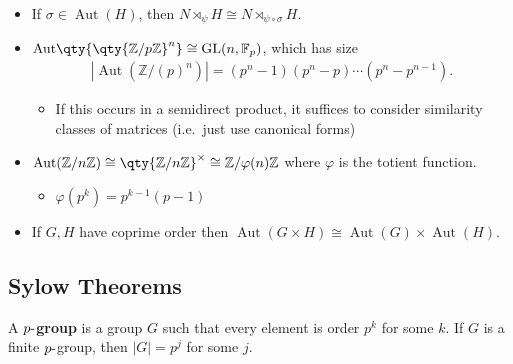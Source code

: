 \begin{fact}

\envlist

\begin{itemize}
\item
  If \(\sigma \in {\operatorname{Aut}}(H)\), then
  \(N \rtimes_\psi H \cong N \rtimes_{\psi \circ \sigma} H\).
\item
  \({\operatorname{Aut}}\qty{ \qty{{\mathbb{Z}}/p{\mathbb{Z}}}^n } \cong \operatorname{GL}(n, {\mathbb{F}}_p)\),
  which has size
  \begin{align*}  
  {\left\lvert {{\operatorname{Aut}}({\mathbb{Z}}/(p)^n)} \right\rvert} = (p^n-1)(p^n-p)\cdots(p^n-p^{n-1})
  .\end{align*}

  \begin{itemize}
  \tightlist
  \item
    If this occurs in a semidirect product, it suffices to consider
    similarity classes of matrices (i.e.~just use canonical forms)
  \end{itemize}
\item
  \({\operatorname{Aut}}({\mathbb{Z}}/n{\mathbb{Z}}) \cong \qty{{\mathbb{Z}}/n{\mathbb{Z}}}^{\times}\cong {\mathbb{Z}}/\varphi(n){\mathbb{Z}}\)
  where \(\varphi\) is the totient function.

  \begin{itemize}
  \tightlist
  \item
    \(\varphi(p^k) = p^{k-1}(p-1)\)
  \end{itemize}
\item
  If \(G, H\) have coprime order then
  \({\operatorname{Aut}}(G \times H) \cong {\operatorname{Aut}}(G) \times{\operatorname{Aut}}(H)\).
\end{itemize}

\end{fact}

\hypertarget{sylow-theorems}{%
\subsection{Sylow Theorems}\label{sylow-theorems}}

\begin{definition}

A \textbf{\(p{\hbox{-}}\)group} is a group \(G\) such that every element
is order \(p^k\) for some \(k\). If \(G\) is a finite
\(p{\hbox{-}}\)group, then \({\left\lvert {G} \right\rvert} = p^j\) for
some \(j\).

\end{definition}

